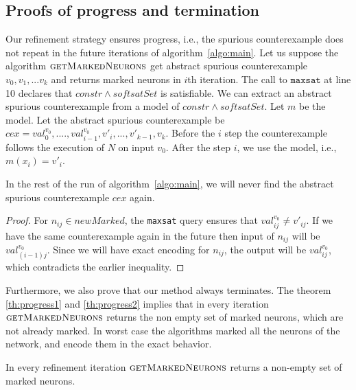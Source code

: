 \subsection{Proofs of progress and termination}

Our refinement strategy ensures progress, i.e., the spurious counterexample does not
repeat in the future
iterations of algorithm~\ref{algo:main}. Let us suppose the algorithm
$\textsc{getMarkedNeurons}$ get abstract spurious counterexample
${v_0}, {v_1}, ... {v_k}$ and
returns marked neurons in $i$th iteration.
The call to $\texttt{maxsat}$ at line 10
declares that $constr \land softsatSet$ is satisfiable.
We can extract an abstract spurious counterexample from a model
of $constr \land softsatSet$.
Let $m$ be the model.
Let the abstract spurious counterexample be $cex = val_0^{v_0}, ...., val^{v_0}_{i-1},v'_{i},...,v'_{k-1},v_k$.
Before the $i$ step the counterexample follows the execution of $N$ on input $v_0$.
After the step $i$, we use the model, i.e., $m(x_i) = v'_i$.

\begin{theorem}
  In the rest of the run of algorithm~\ref{algo:main}, we will never find the abstract
  spurious counterexample
  $cex$ again.
\end{theorem}
\begin{proof}
  For $n_{ij} \in newMarked$, the \texttt{maxsat} query ensures that
  $val^{v_0}_{ij} \neq v'_{ij}$.
  If we have the same counterexample again in the future then
  input of $n_{ij}$ will be $val^{v_0}_{(i-1)j}$.
  Since we will have exact encoding for $n_{ij}$, the output
  will be $val^{v_0}_{ij}$, which contradicts the earlier inequality.  
\end{proof}

Furthermore, we also prove that our method always terminates.
%
The theorem \ref{th:progress1} and \ref{th:progress2} implies that in every
iteration $\textsc{getMarkedNeurons}$
returns the non empty set of marked neurons, which are not already marked. In worst case the algorithms marked all 
the neurons of the network, and encode them in the exact behavior. 





\begin{theorem}
  \label{th:progress1}
  In every refinement iteration $\textsc{getMarkedNeurons}$
  returns a non-empty set of marked neurons. 
\end{theorem}

